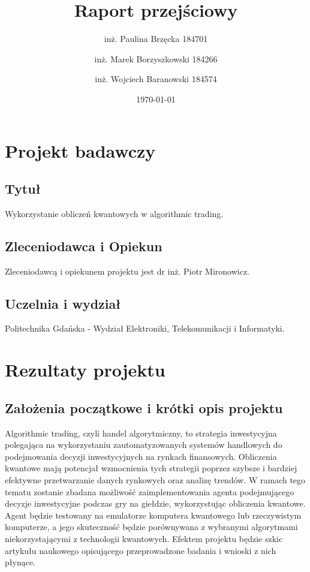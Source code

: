 \documentclass[polish,envcountsect,10pt]{article}
\title{Raport przejściowy}
\author{inż. Paulina Brzęcka 184701 \and inż. Marek Borzyszkowski 184266 \and inż. Wojciech Baranowski 184574}
\date{\today}
\begin{document}
\maketitle
\tableofcontents
\newpage

\section{Projekt badawczy}

\subsection{Tytuł}

Wykorzystanie obliczeń kwantowych w algorithmic trading.

\subsection{Zleceniodawca i Opiekun}

Zleceniodawcą i opiekunem projektu jest dr inż. Piotr Mironowicz.

\subsection{Uczelnia i wydział}

Politechnika Gdańska - Wydział Elektroniki, Telekomunikacji i Informatyki.

\section{Rezultaty projektu}

\subsection{Założenia początkowe i krótki opis projektu}
Algorithmic trading, czyli handel algorytmiczny, to strategia inwestycyjna polegająca na wykorzystaniu zautomatyzowanych systemów handlowych do podejmowania decyzji inwestycyjnych na rynkach finansowych. Obliczenia kwantowe mają potencjał wzmocnienia tych strategii poprzez szybsze i bardziej efektywne przetwarzanie danych rynkowych oraz analizę trendów. W ramach tego tematu zostanie zbadana możliwość zaimplementowania agenta podejmującego decyzje inwestycyjne podczas gry na giełdzie, wykorzystując obliczenia kwantowe. Agent będzie testowany na emulatorze komputera kwantowego lub rzeczywistym komputerze, a jego skuteczność będzie porównywana z wybranymi algorytmami niekorzystającymi z technologii kwantowych. Efektem projektu będzie szkic artykułu naukowego opisującego przeprowadzone badania i wnioski z nich płynące.
\end{document}
